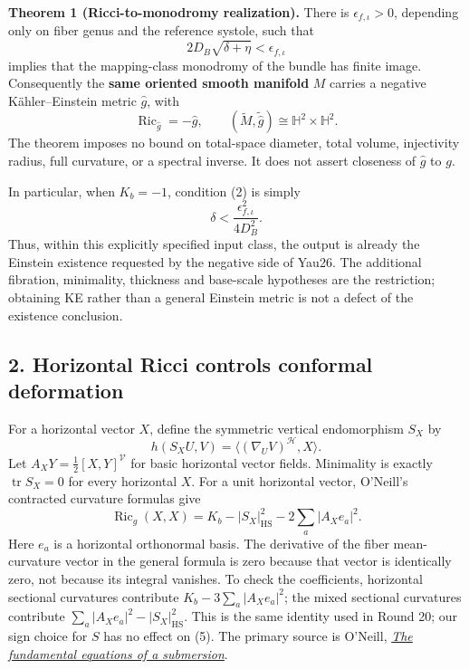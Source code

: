 \documentclass[
  11pt,
]{article}
\begin{document}
\textbf{Theorem 1 (Ricci-to-monodromy realization).} There is
\(\epsilon_{f,\iota}>0\), depending only on fiber genus and the
reference systole, such that \[
                 2D_B\sqrt{\delta+\eta}<\epsilon_{f,\iota}       \tag{2}
\] implies that the mapping-class monodromy of the bundle has finite
image. Consequently the \textbf{same oriented smooth manifold} \(M\)
carries a negative Kähler--Einstein metric \(\widehat g\), with \[
 \operatorname{Ric}_{\widehat g}=-\widehat g,
 \qquad (\widetilde M,\widetilde{\widehat g})
          \cong\mathbb H^2\times\mathbb H^2.                  \tag{3}
\] The theorem imposes no bound on total-space diameter, total volume,
injectivity radius, full curvature, or a spectral inverse. It does not
assert closeness of \(\widehat g\) to \(g\).

In particular, when \(K_b=-1\), condition (2) is simply \[
          \delta<\frac{\epsilon_{f,\iota}^2}{4D_B^2}.          \tag{4}
\] Thus, within this explicitly specified input class, the output is
already the Einstein existence requested by the negative side of Yau26.
The additional fibration, minimality, thickness and base-scale
hypotheses are the restriction; obtaining KE rather than a general
Einstein metric is not a defect of the existence conclusion.

\hypertarget{horizontal-ricci-controls-conformal-deformation}{%
\subsection{2. Horizontal Ricci controls conformal
deformation}\label{horizontal-ricci-controls-conformal-deformation}}

For a horizontal vector \(X\), define the symmetric vertical
endomorphism \(S_X\) by \[
            h(S_XU,V)=\langle(\nabla_UV)^{\mathcal H},X\rangle.
\] Let \(A_XY=\tfrac12[X,Y]^{\mathcal V}\) for basic horizontal vector
fields. Minimality is exactly \(\operatorname{tr}S_X=0\) for every
horizontal \(X\). For a unit horizontal vector, O'Neill's contracted
curvature formulas give \[
 \operatorname{Ric}_g(X,X)
       =K_b-|S_X|_{\mathrm{HS}}^2
                -2\sum_a|A_Xe_a|^2.                         \tag{5}
\] Here \(e_a\) is a horizontal orthonormal basis. The derivative of the
fiber mean-curvature vector in the general formula is zero because that
vector is identically zero, not because its integral vanishes. To check
the coefficients, horizontal sectional curvatures contribute
\(K_b-3\sum_a|A_Xe_a|^2\); the mixed sectional curvatures contribute
\(\sum_a|A_Xe_a|^2-|S_X|_{\mathrm{HS}}^2\). This is the same identity
used in Round 20; our sign choice for \(S\) has no effect on (5). The
primary source is O'Neill,
\href{https://doi.org/10.1307/mmj/1028999604}{\emph{The fundamental
equations of a submersion}}.
\end{document}
